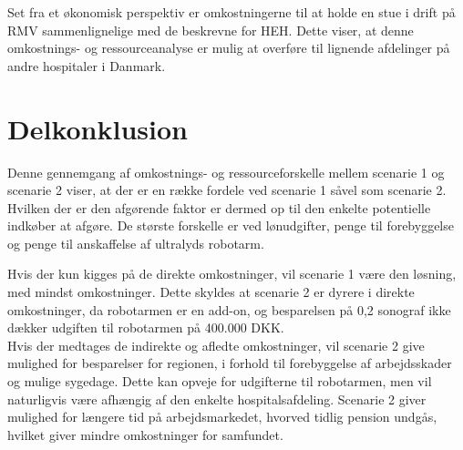 Set fra et økonomisk perspektiv er omkostningerne til at holde en stue i drift på RMV sammenlignelige med de beskrevne for HEH. Dette viser, at denne omkostnings- og ressourceanalyse er mulig at overføre til lignende afdelinger på andre hospitaler i Danmark. 

\section{Delkonklusion}
Denne gennemgang af omkostnings- og ressourceforskelle mellem scenarie 1 og scenarie 2 viser, at der er en række fordele ved scenarie 1 såvel som scenarie 2. Hvilken der er den afgørende faktor er dermed op til den enkelte potentielle indkøber at afgøre. De største forskelle er ved lønudgifter, penge til forebyggelse og penge til anskaffelse af ultralyds robotarm. 

Hvis der kun kigges på de direkte omkostninger, vil scenarie 1 være den løsning, med mindst omkostninger. Dette skyldes at scenarie 2 er dyrere i direkte omkostninger, da robotarmen er en add-on, og besparelsen på 0,2 sonograf ikke dækker udgiften til robotarmen på 400.000 DKK. \\
Hvis der medtages de indirekte og afledte omkostninger, vil scenarie 2 give mulighed for besparelser for regionen, i forhold til forebyggelse af arbejdsskader og mulige sygedage. Dette kan opveje for udgifterne til robotarmen, men vil naturligvis være afhængig af den enkelte hospitalsafdeling. Scenarie 2 giver mulighed for længere tid på arbejdsmarkedet, hvorved tidlig pension undgås, hvilket giver mindre omkostninger for samfundet.

